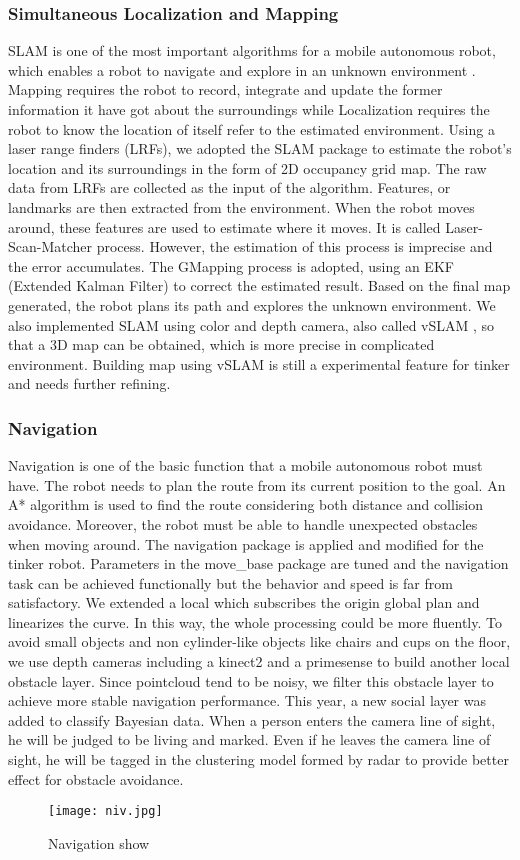 \subsubsection{Simultaneous Localization and Mapping}
SLAM is one of the most important algorithms for a mobile autonomous robot, which enables a robot to navigate and explore in an unknown environment \cite{grisetti2007improved}. Mapping requires the robot to record, integrate and update the former information it have got about the surroundings while Localization requires the robot to know the location of itself refer to the estimated environment. Using a laser range finders (LRFs), we adopted the SLAM package to estimate the robot’s location and its surroundings in the form of 2D occupancy grid map. The raw data from LRFs are collected as the input of the algorithm. Features, or landmarks are then extracted from the environment. When the robot moves around, these features are used to estimate where it moves. It is called Laser-Scan-Matcher process. However, the estimation of this process is imprecise and the error accumulates. The GMapping process is adopted, using an EKF (Extended Kalman Filter) to correct the estimated result. Based on the final map generated, the robot plans its path and explores the unknown environment.
We also implemented SLAM using color and depth camera, also called vSLAM \cite{se2005vision}, so that a 3D map can be obtained, which is more precise in complicated environment. Building map using vSLAM is still a experimental feature for tinker and needs further refining.
\subsubsection{Navigation}
Navigation is one of the basic function that a mobile autonomous robot must have. The robot needs to plan the route from its current position to the goal. An A* algorithm is used to find the route considering both distance and  collision avoidance. Moreover, the robot must be able to handle unexpected obstacles when moving around. The navigation package is applied and modified for the tinker robot. Parameters in the move\_base package are tuned and the navigation task can be achieved functionally but the behavior and speed is far from satisfactory. We extended a local  which subscribes the origin global plan and linearizes the curve. In this way, the whole processing could be more fluently. 
To avoid small objects and non cylinder-like objects like chairs and cups on the floor, we use depth cameras including a kinect2 and a primesense to build another local obstacle layer. Since pointcloud tend to be noisy, we filter this obstacle layer to achieve more stable navigation performance.
This year, a new social layer was added to classify Bayesian data. When a person enters the camera line of sight, he will be judged to be living and marked. Even if he leaves the camera line of sight, he will be tagged in the clustering model formed by radar to provide better effect for obstacle avoidance. 

\begin{figure*}[!t]
	\centering
	\texttt{[image: niv.jpg]}
	\caption{Navigation show}
\end{figure*}
